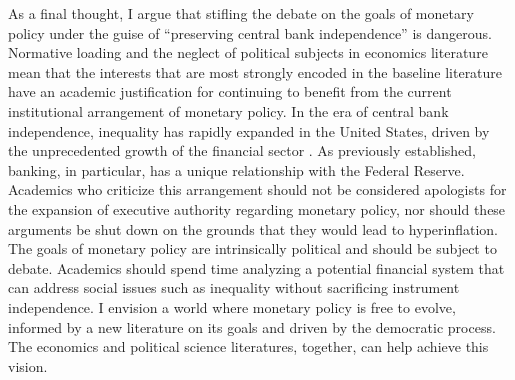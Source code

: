 \documentclass[12pt,a4paper]{article}
\begin{document}
\begin{doublespace}
As a final thought, I argue that stifling the debate on the goals of monetary policy under the guise of ``preserving central bank independence'' is dangerous. Normative loading and the neglect of political subjects in economics literature mean that the interests that are most strongly encoded in the baseline literature have an academic justification for continuing to benefit from the current institutional arrangement of monetary policy. In the era of central bank independence, inequality has rapidly expanded in the United States, driven by the unprecedented growth of the financial sector \parencite{menand_fed_2022, krugman_predatory_2025}. As previously established, banking, in particular, has a unique relationship with the Federal Reserve. Academics who criticize this arrangement should not be considered apologists for the expansion of executive authority regarding monetary policy, nor should these arguments be shut down on the grounds that they would lead to hyperinflation. The goals of monetary policy are intrinsically political and should be subject to debate. Academics should spend time analyzing a potential financial system that can address social issues such as inequality without sacrificing instrument independence. I envision a world where monetary policy is free to evolve, informed by a new literature on its goals and driven by the democratic process. The economics and political science literatures, together, can help achieve this vision.




\end{doublespace}

\newpage

\printbibliography[heading=bibintoc]
\end{document}
